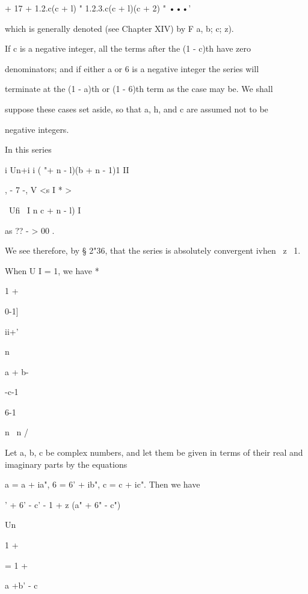   + 17 + 1.2.c(c + l) " 1.2.3.c(c + l)(c + 2) " •••'

which is generally denoted (see Chapter XIV) by F a, b; c; z).

If c is a negative integer, all the terms after the (1 - c)th have
zero

denominators; and if either a or 6 is a negative integer the series
will

terminate at the (1 - a)th or (1 - 6)th term as the case may be. We
shall

suppose these cases set aside, so that a, h, and c are assumed not to
be

negative integers.

  In this series

i Un+i i ( "+ n - l)(b + n - 1)1 II

, - 7 -, V <s I * >

\ Ufi \ I n c + n - l) I

as ?? - > 00 .

We see therefore, by § 2"36, that the series is absolutely convergent
ivhen \ z\ < l, and divergent ivhen | | > 1.

When U I = 1, we have *






1 +



0-1]


ii+'


n


a + b-


-c-1



6-1



n \ n /






Let a, b, c be complex numbers, and let them be given in terms of
their real and imaginary parts by the equations

a = a + ia", 6 = 6' + ib", c = c + ic". Then we have

 ' + 6' - c' - 1 + z (a" + 6" - c")



Un



1 +



= 1 +



a +b' - c



